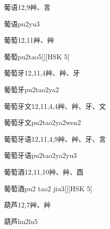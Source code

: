 \begin{entry}{葡语}{12,9}{⾋、⾔}
  \begin{phonetics}{葡语}{pu2yu3}
  \end{phonetics}
\end{entry}

\begin{entry}{葡萄}{12,11}{⾋、⾋}
  \begin{phonetics}{葡萄}{pu2tao5}[][HSK 5]
  \end{phonetics}
\end{entry}

\begin{entry}{葡萄牙}{12,11,4}{⾋、⾋、⽛}
  \begin{phonetics}{葡萄牙}{pu2tao2ya2}
  \end{phonetics}
\end{entry}

\begin{entry}{葡萄牙文}{12,11,4,4}{⾋、⾋、⽛、⽂}
  \begin{phonetics}{葡萄牙文}{pu2tao2ya2wen2}
  \end{phonetics}
\end{entry}

\begin{entry}{葡萄牙语}{12,11,4,9}{⾋、⾋、⽛、⾔}
  \begin{phonetics}{葡萄牙语}{pu2tao2ya2yu3}
  \end{phonetics}
\end{entry}

\begin{entry}{葡萄酒}{12,11,10}{⾋、⾋、⾣}
  \begin{phonetics}{葡萄酒}{pu2 tao2 jiu3}[][HSK 5]
  \end{phonetics}
\end{entry}

\begin{entry}{葫芦}{12,7}{⾋、⾋}
  \begin{phonetics}{葫芦}{hu2lu5}
  \end{phonetics}
\end{entry}

